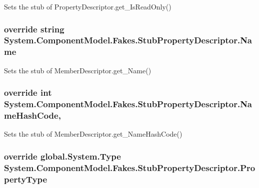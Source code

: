 Sets the stub of Property\-Descriptor.\-get\-\_\-\-Is\-Read\-Only()

\hypertarget{class_system_1_1_component_model_1_1_fakes_1_1_stub_property_descriptor_a2ef40a55f93e49f6c5a0f21f3c45c2e5}{
\subsubsection[{Name}]{\setlength{\rightskip}{0pt plus 5cm}override string System.\-Component\-Model.\-Fakes.\-Stub\-Property\-Descriptor.\-Name\hspace{0.3cm}{\ttfamily [get]}}}\label{class_system_1_1_component_model_1_1_fakes_1_1_stub_property_descriptor_a2ef40a55f93e49f6c5a0f21f3c45c2e5}


Sets the stub of Member\-Descriptor.\-get\-\_\-\-Name()

\hypertarget{class_system_1_1_component_model_1_1_fakes_1_1_stub_property_descriptor_a8225ee6f5c07605fa4c36525ab05a926}{
\subsubsection[{Name\-Hash\-Code}]{\setlength{\rightskip}{0pt plus 5cm}override int System.\-Component\-Model.\-Fakes.\-Stub\-Property\-Descriptor.\-Name\-Hash\-Code\hspace{0.3cm}{\ttfamily [get]}, {\ttfamily [protected]}}}\label{class_system_1_1_component_model_1_1_fakes_1_1_stub_property_descriptor_a8225ee6f5c07605fa4c36525ab05a926}


Sets the stub of Member\-Descriptor.\-get\-\_\-\-Name\-Hash\-Code()

\hypertarget{class_system_1_1_component_model_1_1_fakes_1_1_stub_property_descriptor_aaae123679ab61167fbcfa1dcf0d320f5}{
\subsubsection[{Property\-Type}]{\setlength{\rightskip}{0pt plus 5cm}override global.\-System.\-Type System.\-Component\-Model.\-Fakes.\-Stub\-Property\-Descriptor.\-Property\-Type\hspace{0.3cm}{\ttfamily [get]}}}\label{class_system_1_1_component_model_1_1_fakes_1_1_stub_property_descriptor_aaae123679ab61167fbcfa1dcf0d320f5}


